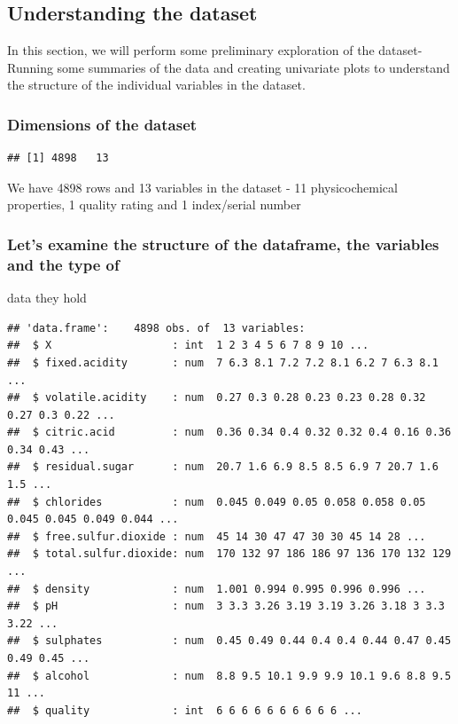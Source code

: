\documentclass[]{article}
\begin{document}
\subsection{Understanding the dataset}\label{understanding-the-dataset}

In this section, we will perform some preliminary exploration of the
dataset- Running some summaries of the data and creating univariate
plots to understand the structure of the individual variables in the
dataset.

\subsubsection{Dimensions of the
dataset}\label{dimensions-of-the-dataset}

\begin{verbatim}
## [1] 4898   13
\end{verbatim}

We have 4898 rows and 13 variables in the dataset - 11 physicochemical
properties, 1 quality rating and 1 index/serial number

\subsubsection{Let's examine the structure of the dataframe, the
variables and the type
of}\label{lets-examine-the-structure-of-the-dataframe-the-variables-and-the-type-of}

data they hold

\begin{verbatim}
## 'data.frame':    4898 obs. of  13 variables:
##  $ X                   : int  1 2 3 4 5 6 7 8 9 10 ...
##  $ fixed.acidity       : num  7 6.3 8.1 7.2 7.2 8.1 6.2 7 6.3 8.1 ...
##  $ volatile.acidity    : num  0.27 0.3 0.28 0.23 0.23 0.28 0.32 0.27 0.3 0.22 ...
##  $ citric.acid         : num  0.36 0.34 0.4 0.32 0.32 0.4 0.16 0.36 0.34 0.43 ...
##  $ residual.sugar      : num  20.7 1.6 6.9 8.5 8.5 6.9 7 20.7 1.6 1.5 ...
##  $ chlorides           : num  0.045 0.049 0.05 0.058 0.058 0.05 0.045 0.045 0.049 0.044 ...
##  $ free.sulfur.dioxide : num  45 14 30 47 47 30 30 45 14 28 ...
##  $ total.sulfur.dioxide: num  170 132 97 186 186 97 136 170 132 129 ...
##  $ density             : num  1.001 0.994 0.995 0.996 0.996 ...
##  $ pH                  : num  3 3.3 3.26 3.19 3.19 3.26 3.18 3 3.3 3.22 ...
##  $ sulphates           : num  0.45 0.49 0.44 0.4 0.4 0.44 0.47 0.45 0.49 0.45 ...
##  $ alcohol             : num  8.8 9.5 10.1 9.9 9.9 10.1 9.6 8.8 9.5 11 ...
##  $ quality             : int  6 6 6 6 6 6 6 6 6 6 ...
\end{verbatim}
\end{document}
